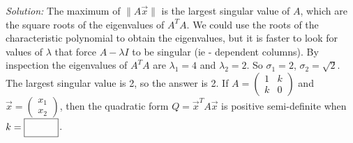     \ifnum {} {\color{DarkBlue} \textit{Solution:}  The maximum of $\|A\vec x\|$ is the largest singular value of $A$, which are the square roots of the eigenvalues of $A^TA$. We could use the roots of the characteristic polynomial to obtain the eigenvalues, but it is faster to look for values of $\lambda$ that force $A - \lambda I$ to be singular (ie - dependent columns). By inspection the eigenvalues of $A^TA$ are $\lambda_1=4$ and $\lambda_2 = 2$. So $\sigma_1 = 2$, $\sigma_2 = \sqrt 2$. The largest singular value is 2, so the answer is 2. } \fi    
\fi 
\ifnum {}
    If $A = \begin{pmatrix} 1&k\\k&0\end{pmatrix}$ and $\vec x = \begin{pmatrix} x_1\\x_2\end{pmatrix}$, then the quadratic form $Q = \vec x ^T A \vec x$ is positive semi-definite when $k = \framebox{\strut\hspace{1cm}}$. 
    
